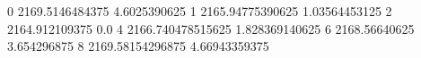 0 2169.5146484375 4.6025390625
1 2165.94775390625 1.03564453125
2 2164.912109375 0.0
4 2166.740478515625 1.828369140625
6 2168.56640625 3.654296875
8 2169.58154296875 4.66943359375
